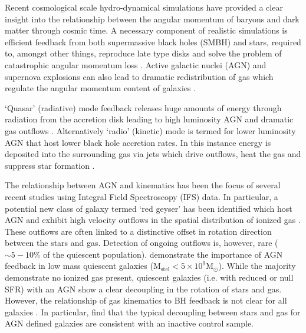 \documentclass[fleqn,usenatbib]{mnras}
\begin{document}
Recent cosmological scale hydro-dynamical simulations have provided a clear insight into the relationship between the angular momentum of baryons and dark matter through cosmic time. A necessary component of realistic simulations is efficient feedback from both supermassive black holes (SMBH) and stars, required to, amongst other things, reproduce late type disks and solve the problem of catastrophic angular momentum loss \citep[e.g.][]{zavala2008, scannapieco2009}. Active galactic nuclei (AGN) and supernova explosions can also lead to dramatic redistribution of gas which regulate the angular momentum content of galaxies \citep[e.g.][]{genel2015, DeFelippis2017}. 

`Quasar' (radiative) mode feedback releases huge amounts of energy through radiation from the accretion disk leading to high luminosity AGN and dramatic gas outflows \citep[e.g.][]{cattaneo2009, rubin2014, cheung2016}. Alternatively `radio' (kinetic) mode is termed for lower luminosity AGN that host lower black hole accretion rates. In this instance energy is deposited into the surrounding gas via jets which drive outflows, heat the gas and suppress star formation \citep[][]{binney1995, ciotti2001, heckman2014}.

The relationship between AGN and kinematics has been the focus of several recent studies using Integral Field Spectroscopy (IFS) data. In particular, a potential new class of galaxy termed `red geyser' has been identified which host AGN and exhibit high velocity outflows in the spatial distribution of ionized gas \citep[][]{cheung2016, roy2018}. These outflows are often linked to a distinctive offset in rotation direction between the stars and gas. Detection of ongoing outflows is, however, rare ($\sim5-10$\% of the quiescent population). \citet{penny2018} demonstrate the importance of AGN feedback in low mass quiescent galaxies ($\mathrm{M_{stel} < 5 \times 10^{9}M_{\odot}}$). While the majority demonstrate no ionized gas present, quiescent galaxies (i.e. with reduced or null SFR) with an AGN show a clear decoupling in the rotation of stars and gas. However, the relationship of gas kinematics to BH feedback is not clear for all galaxies \citep[see also:][]{koudmani2019}. In particular, \citet{ilha2019} find that the typical decoupling between stars and gas for AGN defined galaxies are consistent with an inactive control sample. 
\end{document}
